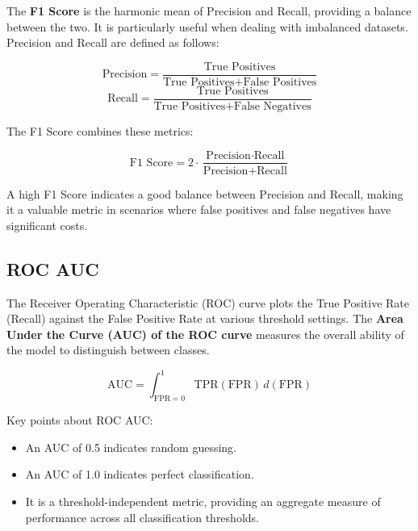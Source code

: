 \documentclass{article}%
\begin{document}
                The \textbf{F1 Score} is the harmonic mean of Precision and Recall, providing a balance between the two. 
                It is particularly useful when dealing with imbalanced datasets. Precision and Recall are defined as follows:

                \[
                \text{Precision} = \frac{\text{True Positives}}{\text{True Positives} + \text{False Positives}}
                \]
                \[
                \text{Recall} = \frac{\text{True Positives}}{\text{True Positives} + \text{False Negatives}}
                \]

                The F1 Score combines these metrics:

                \[
                \text{F1 Score} = 2 \cdot \frac{\text{Precision} \cdot \text{Recall}}{\text{Precision} + \text{Recall}}
                \]

                A high F1 Score indicates a good balance between Precision and Recall, making it a valuable metric in scenarios where false positives 
                and false negatives have significant costs.
                

%
\subsection{ROC AUC}%
\label{subsec:ROCAUC}%

                The Receiver Operating Characteristic (ROC) curve plots the True Positive Rate (Recall) against the False Positive Rate at various threshold settings. 
                The \textbf{Area Under the Curve (AUC) of the ROC curve} measures the overall ability of the model to distinguish between classes. 

                \[
                \text{AUC} = \int_{\text{FPR}=0}^{1} \text{TPR}(\text{FPR}) \, d(\text{FPR})
                \]

                Key points about ROC AUC:
                \begin{itemize}
                    \item An AUC of 0.5 indicates random guessing.
                    \item An AUC of 1.0 indicates perfect classification.
                    \item It is a threshold-independent metric, providing an aggregate measure of performance across all classification thresholds.
                \end{itemize}
\end{document}
